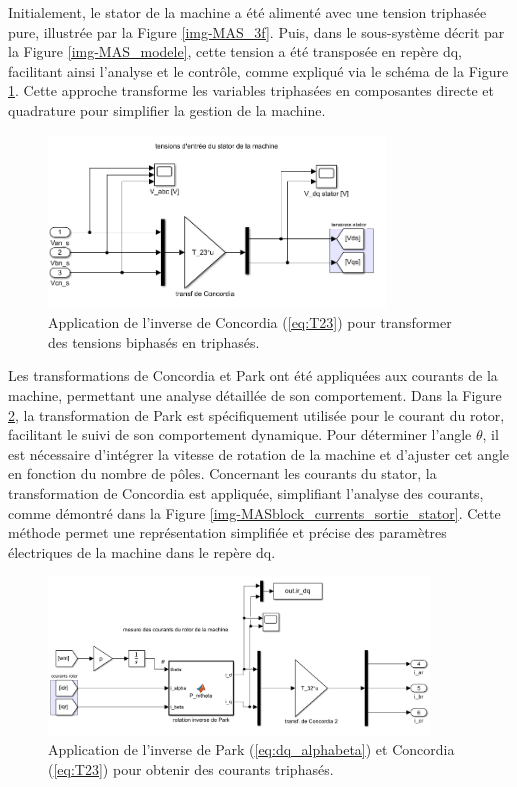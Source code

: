 Initialement, le stator de la machine a été alimenté avec une tension triphasée pure, illustrée par la Figure \ref{img-MAS_3f}. Puis, dans le sous-système décrit par la Figure \ref{img-MAS_modele}, cette tension a été transposée en repère dq, facilitant ainsi l'analyse et le contrôle, comme expliqué via le schéma de la Figure \ref{img-MASblock/MASblock_tensions}. Cette approche transforme les variables triphasées en composantes directe et quadrature pour simplifier la gestion de la machine.


\begin{figure}[!h]
    \centering
    \includegraphics[width=0.8\textwidth]{imgsMATLAB/MAS/MASblock/MASblock_tensions.png} 
    \caption{Application de l'inverse de Concordia (\ref{eq:T23}) pour transformer des tensions biphasés en triphasés.}
    \label{img-MASblock/MASblock_tensions}
\end{figure}


Les transformations de Concordia et Park ont été appliquées aux courants de la machine, permettant une analyse détaillée de son comportement. Dans la Figure \ref{img-MASblock_ir_out}, la transformation de Park est spécifiquement utilisée pour le courant du rotor, facilitant le suivi de son comportement dynamique. Pour déterminer l'angle \(\theta\), il est nécessaire d'intégrer la vitesse de rotation de la machine et d'ajuster cet angle en fonction du nombre de pôles. Concernant les courants du stator, la transformation de Concordia est appliquée, simplifiant l'analyse des courants, comme démontré dans la Figure \ref{img-MASblock_currents_sortie_stator}. Cette méthode permet une représentation simplifiée et précise des paramètres électriques de la machine dans le repère dq.



\begin{figure}[!h]
    \centering
    \includegraphics[width=0.9\textwidth]{imgsMATLAB/MAS/MASblock/MASblock_ir_out.png} 
    \caption{Application de l'inverse de Park (\ref{eq:dq_alphabeta}) et Concordia (\ref{eq:T23}) pour obtenir des courants triphasés.}
    \label{img-MASblock_ir_out}
\end{figure}


